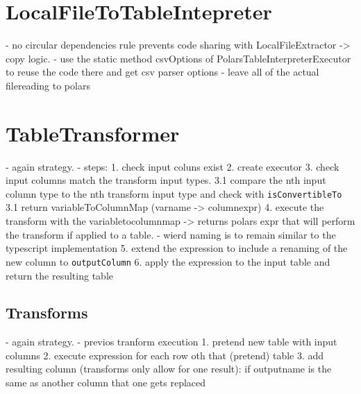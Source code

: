 \section{LocalFileToTableIntepreter}
- no circular dependencies rule prevents code sharing with LocalFileExtractor -> copy logic.
- use the static method csvOptions of PolarsTableInterpreterExecutor to reuse the code there and get csv parser options
- leave all of the actual filereading to polars


\section{TableTransformer}
- again strategy.
- steps:
1. check input coluns exist
2. create executor
3. check input columns match the transform input types.
3.1 compare the nth input column type to the nth transform input type and check with \Verb|isConvertibleTo|
3.1 return variableToColumnMap (varname -> columnexpr)
4. execute the transform with the variabletocolumnmap -> returns polars expr that will perform the transform if applied to a table.
- wierd naming is to remain similar to the typescript implementation
5. extend the expression to include a renaming of the new column to \Verb|outputColumn|
6. apply the expression to the input table and return the resulting table

\subsection{Transforms}
- again strategy.
- previos tranform execution
1. pretend new table with input columns
2. execute expression for each row oth that (pretend) table
3. add resulting column (transforms only allow for one result): if outputname is the same as another column that one gets replaced

